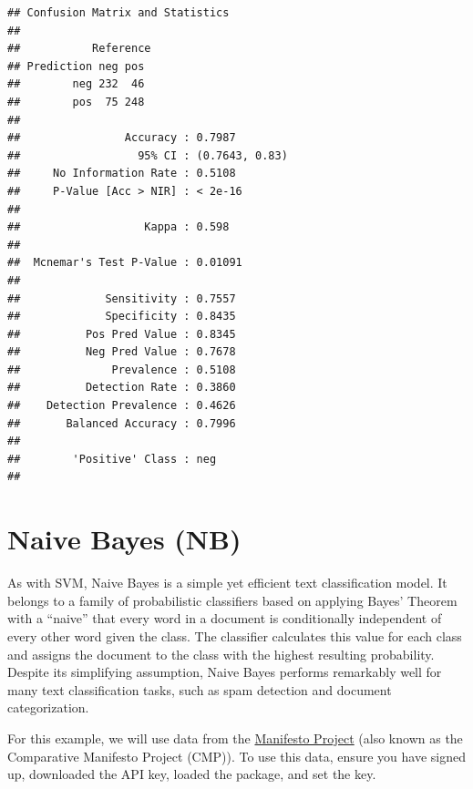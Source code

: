 \documentclass[
]{book}
\begin{document}
\begin{verbatim}
## Confusion Matrix and Statistics
## 
##           Reference
## Prediction neg pos
##        neg 232  46
##        pos  75 248
##                                         
##                Accuracy : 0.7987        
##                  95% CI : (0.7643, 0.83)
##     No Information Rate : 0.5108        
##     P-Value [Acc > NIR] : < 2e-16       
##                                         
##                   Kappa : 0.598         
##                                         
##  Mcnemar's Test P-Value : 0.01091       
##                                         
##             Sensitivity : 0.7557        
##             Specificity : 0.8435        
##          Pos Pred Value : 0.8345        
##          Neg Pred Value : 0.7678        
##              Prevalence : 0.5108        
##          Detection Rate : 0.3860        
##    Detection Prevalence : 0.4626        
##       Balanced Accuracy : 0.7996        
##                                         
##        'Positive' Class : neg           
## 
\end{verbatim}

\section{Naive Bayes (NB)}\label{naive-bayes-nb}

As with SVM, Naive Bayes is a simple yet efficient text classification model. It belongs to a family of probabilistic classifiers based on applying Bayes' Theorem with a ``naive'' that every word in a document is conditionally independent of every other word given the class. The classifier calculates this value for each class and assigns the document to the class with the highest resulting probability. Despite its simplifying assumption, Naive Bayes performs remarkably well for many text classification tasks, such as spam detection and document categorization.

For this example, we will use data from the \href{https://manifestoproject.wzb.eu/}{Manifesto Project} (also known as the Comparative Manifesto Project (CMP)). To use this data, ensure you have signed up, downloaded the API key, loaded the package, and set the key.
\end{document}
